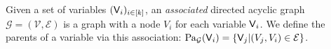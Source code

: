 \begin{definition}
Given a set of variables $(\mathsf{V}_i)_{i\in [k]}$, an \emph{associated} directed acyclic graph $\mathcal{G}=(\mathcal{V},\mathcal{E})$ is a graph with a node $V_i$ for each variable $\mathsf{V}_i$. We define the parents of a variable via this association: $\mathrm{Pa}_\mathcal{G}(\mathsf{V}_i)=\{\mathsf{V}_j|(V_j,V_i)\in \mathcal{E}\}$.
\end{definition}